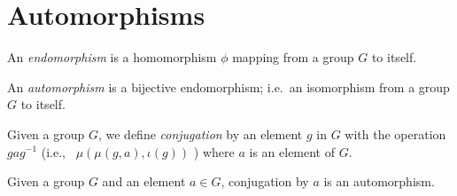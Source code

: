 \section{Automorphisms}

\begin{definition}[Endomorphism]
    \label{definition : Endomorphism}
    \leanok
    An \emph{endomorphism} is a homomorphism \( \phi \) mapping from a group \( G \) to itself.
\end{definition}

\begin{definition}[Automorphism]
    \label{definition : Automorphism}
    \leanok
    An \emph{automorphism} is a bijective endomorphism; i.e.~an isomorphism
    from a group \( G \) to itself.
\end{definition}

\begin{definition}[Conjugate]
    \label{definition : Conjugate}
    \leanok
    Given a group \( G \), we define \emph{conjugation} by an element
    \( g \) in \( G \) with the operation \( g ag^{-1} \) (i.e.,~ \(
    \mu(\mu(g,a),\iota(g)) \) ) where \( a \) is an
    element of \( G \).
\end{definition}

\begin{theorem}
    \label{theorem : conj_automorphism}
    \leanok
    Given a group \( G \) and an element \( a \in G \), conjugation by \( a \)
    is an automorphism.
\end{theorem}

